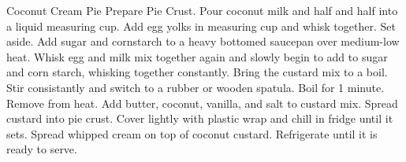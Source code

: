 \documentclass[../main.tex]{subfiles}
\begin{document}
\begin{recipe}{Coconut Cream Pie}{}{}
    Prepare Pie Crust.
    Pour coconut milk and half and half into a liquid measuring cup.
    Add egg yolks in measuring cup and whisk together. Set aside.
    Add sugar and cornstarch to a heavy bottomed saucepan over medium-low heat.
    Whisk egg and milk mix together again and slowly begin to add to sugar and
    corn starch, whisking together constantly. Bring the custard mix to a boil.
    Stir consistantly and switch to a rubber or wooden spatula. Boil for 1
    minute. Remove from heat.
    Add butter, coconut, vanilla, and salt to custard mix. Spread custard into
    pie crust. Cover lightly with plastic wrap and chill in fridge until it
    sets.
    Spread whipped cream on top of coconut custard. Refrigerate until it is
    ready to serve.
\end{recipe}
\end{document}
